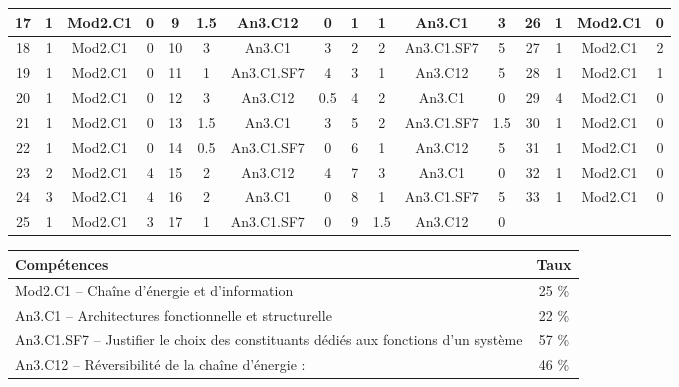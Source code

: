 \begin{center}
\begin{tabular}{|c|c|c|c||c|c|c|c||c|c|c|c||c|c|c|c|}
17 & 1 & Mod2.C1 & 0 & 9 & 1.5 & An3.C12 & 0 & 1 & 1 & An3.C1 & 3 & 26 & 1 & Mod2.C1 & 0 \\ \hline 
18 & 1 & Mod2.C1 & 0 & 10 & 3 & An3.C1 & 3 & 2 & 2 & An3.C1.SF7 & 5 & 27 & 1 & Mod2.C1 & 2 \\ \hline 
19 & 1 & Mod2.C1 & 0 & 11 & 1 & An3.C1.SF7 & 4 & 3 & 1 & An3.C12 & 5 & 28 & 1 & Mod2.C1 & 1 \\ \hline 
20 & 1 & Mod2.C1 & 0 & 12 & 3 & An3.C12 & 0.5 & 4 & 2 & An3.C1 & 0 & 29 & 4 & Mod2.C1 & 0 \\ \hline 
21 & 1 & Mod2.C1 & 0 & 13 & 1.5 & An3.C1 & 3 & 5 & 2 & An3.C1.SF7 & 1.5 & 30 & 1 & Mod2.C1 & 0 \\ \hline 
22 & 1 & Mod2.C1 & 0 & 14 & 0.5 & An3.C1.SF7 & 0 & 6 & 1 & An3.C12 & 5 & 31 & 1 & Mod2.C1 & 0 \\ \hline 
23 & 2 & Mod2.C1 & 4 & 15 & 2 & An3.C12 & 4 & 7 & 3 & An3.C1 & 0 & 32 & 1 & Mod2.C1 & 0 \\ \hline 
24 & 3 & Mod2.C1 & 4 & 16 & 2 & An3.C1 & 0 & 8 & 1 & An3.C1.SF7 & 5 & 33 & 1 & Mod2.C1 & 0 \\ \hline 
25 & 1 & Mod2.C1 & 3 & 17 & 1 & An3.C1.SF7 & 0 & 9 & 1.5 & An3.C12 & 0 &  &  &  &  \\ \hline 

\end{tabular} 
\end{center} 
\normalsize 
 
\footnotesize 
\begin{center} 
\begin{tabular}{|p{.7\linewidth}|c|} 
\hline 
Compétences  & Taux \\ \hline \hline 
Mod2.C1 -- Chaîne d’énergie et d'information&25 \% \\ \hline 
An3.C1 -- Architectures fonctionnelle et structurelle &22 \% \\ \hline 
An3.C1.SF7 -- Justifier le choix des constituants dédiés aux fonctions d’un système&57 \% \\ \hline 
An3.C12 -- Réversibilité de la chaîne d’énergie :&46 \% \\ \hline 
\end{tabular} 
\end{center} 
\normalsize 
 

